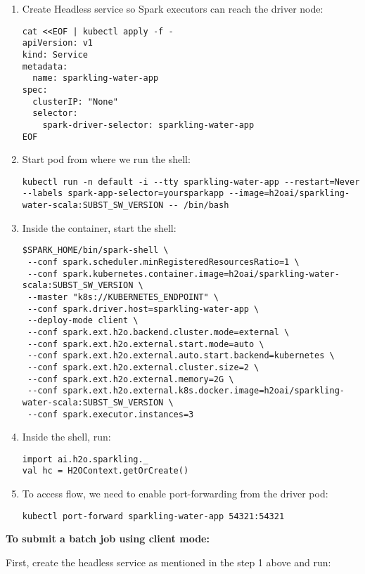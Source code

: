 \begin{enumerate}
    \item Create Headless service so Spark executors can reach the driver node:
    \begin{lstlisting}[style=Bash]
cat <<EOF | kubectl apply -f -
apiVersion: v1
kind: Service
metadata:
  name: sparkling-water-app
spec:
  clusterIP: "None"
  selector:
    spark-driver-selector: sparkling-water-app
EOF
    \end{lstlisting}
    \item Start pod from where we run the shell:
    \begin{lstlisting}[style=Bash]
kubectl run -n default -i --tty sparkling-water-app --restart=Never --labels spark-app-selector=yoursparkapp --image=h2oai/sparkling-water-scala:SUBST_SW_VERSION -- /bin/bash
    \end{lstlisting}
    \item Inside the container, start the shell:
    \begin{lstlisting}[style=Bash]
$SPARK_HOME/bin/spark-shell \
 --conf spark.scheduler.minRegisteredResourcesRatio=1 \
 --conf spark.kubernetes.container.image=h2oai/sparkling-water-scala:SUBST_SW_VERSION \
 --master "k8s://KUBERNETES_ENDPOINT" \
 --conf spark.driver.host=sparkling-water-app \
 --deploy-mode client \
 --conf spark.ext.h2o.backend.cluster.mode=external \
 --conf spark.ext.h2o.external.start.mode=auto \
 --conf spark.ext.h2o.external.auto.start.backend=kubernetes \
 --conf spark.ext.h2o.external.cluster.size=2 \
 --conf spark.ext.h2o.external.memory=2G \
 --conf spark.ext.h2o.external.k8s.docker.image=h2oai/sparkling-water-scala:SUBST_SW_VERSION \
 --conf spark.executor.instances=3
    \end{lstlisting}
    \item Inside the shell, run:
    \begin{lstlisting}[style=Scala]
import ai.h2o.sparkling._
val hc = H2OContext.getOrCreate()
    \end{lstlisting}
    \item To access flow, we need to enable port-forwarding from the driver pod:
    \begin{lstlisting}[style=Bash]
kubectl port-forward sparkling-water-app 54321:54321
    \end{lstlisting}
\end{enumerate}

\textbf{To submit a batch job using client mode:}

First, create the headless service as mentioned in the step 1 above and run:

